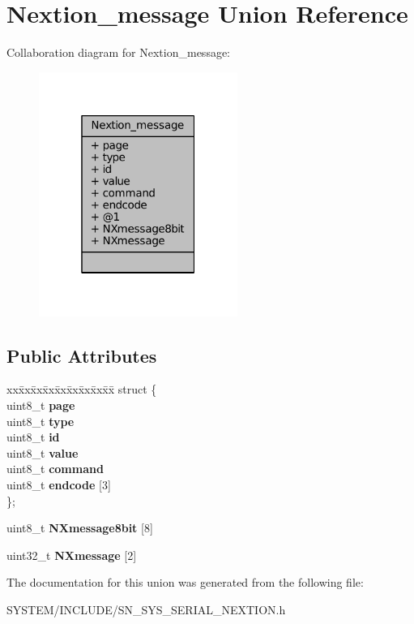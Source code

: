 \hypertarget{unionNextion__message}{}\section{Nextion\+\_\+message Union Reference}
\label{unionNextion__message}


Collaboration diagram for Nextion\+\_\+message\+:\nopagebreak
\begin{figure}[H]
\begin{center}
\leavevmode
\includegraphics[width=184pt]{unionNextion__message__coll__graph}
\end{center}
\end{figure}
\subsection*{Public Attributes}
\begin{DoxyCompactItemize}
\item 
\mbox{\label{unionNextion__message_a27222400844ea5f66aae9cedf02e896a}} 
\begin{tabbing}
xx\=xx\=xx\=xx\=xx\=xx\=xx\=xx\=xx\=\kill
struct \{\\
\>uint8\_t {\bfseries page}\\
\>uint8\_t {\bfseries type}\\
\>uint8\_t {\bfseries id}\\
\>uint8\_t {\bfseries value}\\
\>uint8\_t {\bfseries command}\\
\>uint8\_t {\bfseries endcode} \mbox{[}3\mbox{]}\\
\}; \\

\end{tabbing}\item 
\mbox{\label{unionNextion__message_a4ae2d319d4a0b00ad495bfcc41478dc5}} 
uint8\+\_\+t {\bfseries N\+Xmessage8bit} \mbox{[}8\mbox{]}
\item 
\mbox{\label{unionNextion__message_a41e260dcf8e2c23d78a746433b1626e1}} 
uint32\+\_\+t {\bfseries N\+Xmessage} \mbox{[}2\mbox{]}
\end{DoxyCompactItemize}


The documentation for this union was generated from the following file\+:\begin{DoxyCompactItemize}
\item 
S\+Y\+S\+T\+E\+M/\+I\+N\+C\+L\+U\+D\+E/S\+N\+\_\+\+S\+Y\+S\+\_\+\+S\+E\+R\+I\+A\+L\+\_\+\+N\+E\+X\+T\+I\+O\+N.\+h\end{DoxyCompactItemize}
